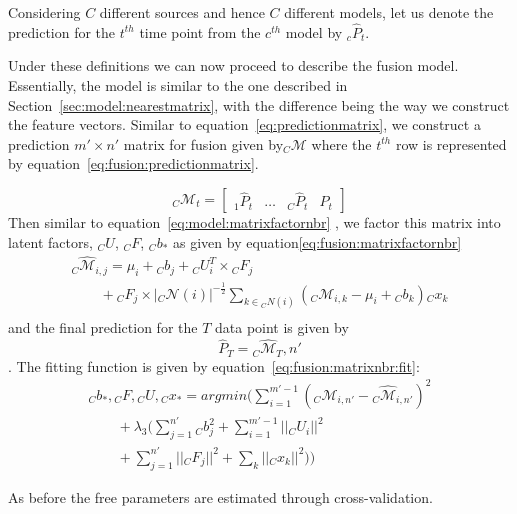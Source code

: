 Considering $C$ different sources and hence $C$ different models, 
let us denote the prediction for the $t^{th}$ time point 
from the $c^{th}$ model by ${}_c\widehat{P}_t$.

Under these definitions we can now proceed to describe the fusion 
model. Essentially, the model is similar to the one described in 
Section~\ref{sec:model:nearestmatrix}, with the difference being 
the way we construct the feature vectors. Similar to equation~\ref{eq:predictionmatrix},
we construct a prediction  $m'\times n'$ matrix for fusion given by${}_C\mathcal{M}$ where 
the $t^{th}$ row is represented by equation~\ref{eq:fusion:predictionmatrix}.

\begin{equation}
  \label{eq:fusion:predictionmatrix}
  {}_C\mathcal{M}_{t} = \left[\begin{array}{llll}
      {}_1\widehat{P}_{t}& \dots & {}_C\widehat{P}_t & P_t 
    \end{array}
  \right]
\end{equation}
Then similar to equation~\ref{eq:model:matrixfactornbr}
, we factor this matrix into latent factors, ${}_C U$, ${}_C F$, ${}_C b_*$ as 
given by equation\ref{eq:fusion:matrixfactornbr}
\begin{equation}
  \label{eq:fusion:matrixfactornbr}
  \begin{array}{l}
    {}_C \widehat{\mathcal{M}}_{i,j} =  \mu_i + {}_C b_{j} + {}_C U_i^T\times {}_C F_j \\
                                \qquad + {}_C F_j \times |{}_C \mathcal{N}(i)|^{-\frac{1}{2}}
    \sum_{k \in {}_C N(i)} ({}_C\mathcal{M}_{i,k} - \mu_i + {}_C b_{k}) {}_Cx_k \\
  \end{array}
\end{equation}
and the final prediction for the
$T$ data point is given by
\[\widehat{P}_T = {}_C \widehat{\mathcal{M}}_T,n'\].
The fitting function is given by equation~\ref{eq:fusion:matrixnbr:fit}:
\begin{equation}
  \label{eq:fusion:matrixnbr:fit}
  \begin{array}{l}
    {}_C b_*, {}_C F, {}_C U, {}_C x_*  = argmin (\sum \limits_{i=1}^{m'-1} \left({}_C \mathcal{M}_{i,n'} - {}_C \widehat{\mathcal{M}}_{i,n'}   \right)^2 \\
     \qquad + \lambda_3 (\sum \limits_{j=1}^{n'}{}_C b_j^2 + \sum \limits_{i=1}^{m'-1} ||{}_C U_i||^2 \\
     \qquad+ \sum \limits_{j=1}^{n'} ||{}_C F_j||^2 + \sum_k ||{}_C x_k||^2))
  \end{array}
\end{equation}

As before the free parameters are estimated through cross-validation.

